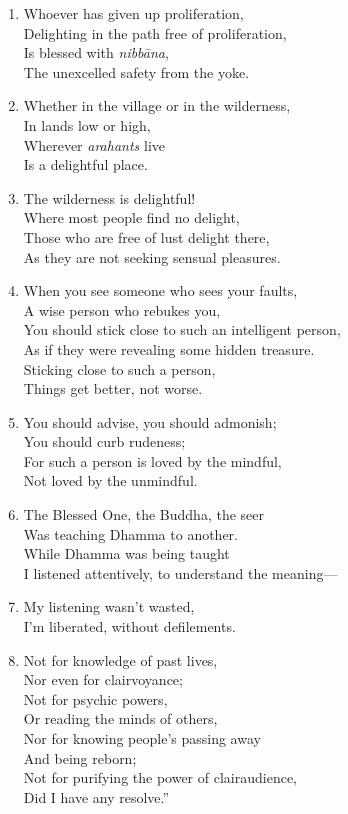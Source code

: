 \documentclass[10pt, openany]{book}
\begin{document}
\begin{enumerate}
\item Whoever has given up proliferation,\\
Delighting in the path free of proliferation,\\
Is blessed with \emph{nibbāna},\\
The unexcelled safety from the yoke.

\item Whether in the village or in the wilderness,\\
In lands low or high,\\
Wherever \emph{arahants} live\\
Is a delightful place.

\item The wilderness is delightful!\\
Where most people find no delight,\\
Those who are free of lust delight there,\\
As they are not seeking sensual pleasures.

\item When you see someone who sees your faults,\\
A wise person who rebukes you,\\
You should stick close to such an intelligent person,\\
As if they were revealing some hidden treasure.\\
Sticking close to such a person, \\
Things get better, not worse.

\item You should advise, you should admonish;\\
You should curb rudeness;\\
For such a person is loved by the mindful,\\
Not loved by the unmindful.

\item The Blessed One, the Buddha, the seer\\
Was teaching Dhamma to another.\\
While Dhamma was being taught\\
I listened attentively, to understand the meaning—

\item My listening wasn’t wasted,\\
I’m liberated, without defilements.

\item Not for knowledge of past lives,\\
Nor even for clairvoyance;\\
Not for psychic powers, \\
Or reading the minds of others,\\
Nor for knowing people’s passing away \\
And being reborn;\\
Not for purifying the power of clairaudience,\\
Did I have any resolve.”


\end{enumerate}
\end{document}
